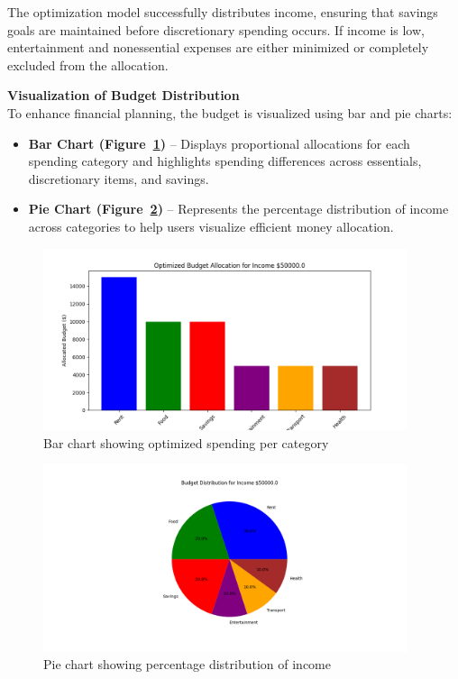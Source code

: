 \documentclass{article}
\begin{document}
The optimization model successfully distributes income, ensuring that savings goals are maintained before discretionary spending occurs. If income is low, entertainment and nonessential expenses are either minimized or completely excluded from the allocation.

\textbf{Visualization of Budget Distribution} \\
To enhance financial planning, the budget is visualized using bar and pie charts:

\begin{itemize}
    \item \textbf{Bar Chart (Figure~\ref{fig:bar_chart})} – Displays proportional allocations for each spending category and highlights spending differences across essentials, discretionary items, and savings.
    \item \textbf{Pie Chart (Figure~\ref{fig:pie_chart})} – Represents the percentage distribution of income across categories to help users visualize efficient money allocation.
\end{itemize}

\begin{figure}[h!]
    \centering
    \includegraphics[width=0.95\textwidth]{optimizedbudget.png}
    \caption{Bar chart showing optimized spending per category}
    \label{fig:bar_chart}
\end{figure}

\begin{figure}[h!]
    \centering
    \includegraphics[width=0.95\textwidth]{piebudget.png}
    \caption{Pie chart showing percentage distribution of income}
    \label{fig:pie_chart}
\end{figure}
\end{document}
